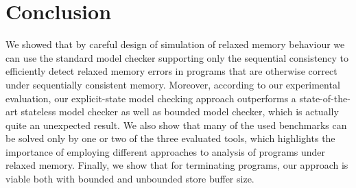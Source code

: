 
\section{Conclusion} \label{sec:conclusion}

We showed that by careful design of simulation of relaxed memory behaviour we
can use the standard model checker supporting only the sequential consistency to
efficiently detect relaxed memory errors in programs that are otherwise correct
under sequentially consistent memory. Moreover, according to our experimental
evaluation, our explicit-state model checking approach outperforms
a state-of-the-art stateless model checker as well as bounded model checker,
which is actually quite an unexpected result. We also show that many of the used
benchmarks can be solved only by one or two of the three evaluated tools, which
highlights the importance of employing different approaches to analysis of programs
under relaxed memory. Finally, we show that for terminating programs, our
approach is viable both with bounded and unbounded store buffer size.


